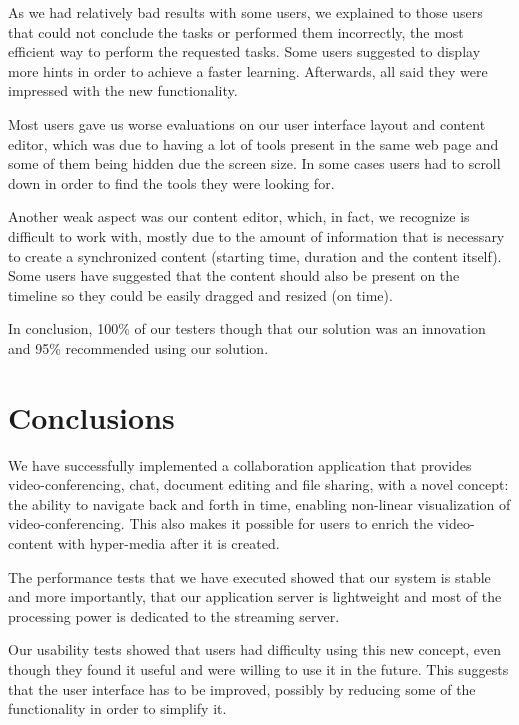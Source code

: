 \documentclass[10pt,conference]{IEEEtran}
\begin{document}
As we had relatively bad results with some users, we explained to those users that could not conclude the tasks or performed them incorrectly, the most efficient way to perform the requested tasks.
Some users suggested to display more hints in order to achieve a faster learning.
Afterwards, all said they were impressed with the new functionality.

Most users gave us worse evaluations on our user interface layout and content editor, which was due to having a lot of tools present in the same web page and some of them being hidden due the screen size.
In some cases users had to scroll down in order to find the tools they were looking for. 

Another weak aspect was our content editor, which, in fact, we recognize is difficult to work with, mostly due to the amount of information that is necessary to create a synchronized content (starting time, duration and the content itself).
Some users have suggested that the content should also be present on the timeline so they could be easily dragged and resized (on time).

In conclusion, 100\% of our testers though that our solution was an innovation and 95\% recommended using our solution.
















\section{Conclusions}
\label{chapter:conclusion}

We have successfully implemented a collaboration application that provides video-conferencing, chat, document editing and file sharing, with a novel concept: the ability to navigate back and forth in time, enabling non-linear visualization of video-conferencing.
This also makes it possible for users to enrich the video-content with hyper-media after it is created.

The performance tests that we have executed showed that our system is stable and more importantly, that our application server is lightweight and most of the processing power is dedicated to the streaming server.

Our usability tests showed that users had difficulty using this new concept, even though they found it useful and were willing to use it in the future.
This suggests that the user interface has to be improved, possibly by reducing some of the functionality in order to simplify it.
\end{document}
